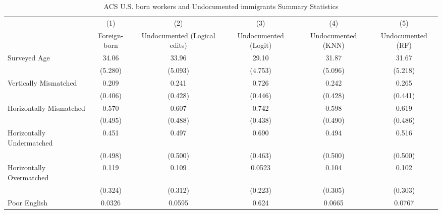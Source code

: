 \begin{table}[htbp]\centering
\def\sym#1{\ifmmode^{#1}\else\(^{#1}\)\fi}
\caption{ACS U.S. born workers and Undocumented immigrants Summary Statistics \label{tab:sum}}
\begin{tabular}{l*{5}{c}}
\hline\hline
                    &\multicolumn{1}{c}{(1)}         &\multicolumn{1}{c}{(2)}         &\multicolumn{1}{c}{(3)}         &\multicolumn{1}{c}{(4)}         &\multicolumn{1}{c}{(5)}         \\
                    &Foreign-born         &Undocumented (Logical edits)         &Undocumented (Logit)         &Undocumented (KNN)         &Undocumented (RF)         \\
\hline
Surveyed Age        &       34.06         &       33.96         &       29.10         &       31.87         &       31.67         \\
                    &     (5.280)         &     (5.093)         &     (4.753)         &     (5.096)         &     (5.218)         \\
[1em]
Vertically Mismatched&       0.209         &       0.241         &       0.726         &       0.242         &       0.265         \\
                    &     (0.406)         &     (0.428)         &     (0.446)         &     (0.428)         &     (0.441)         \\
[1em]
Horizontally Mismatched&       0.570         &       0.607         &       0.742         &       0.598         &       0.619         \\
                    &     (0.495)         &     (0.488)         &     (0.438)         &     (0.490)         &     (0.486)         \\
[1em]
Horizontally Undermatched&       0.451         &       0.497         &       0.690         &       0.494         &       0.516         \\
                    &     (0.498)         &     (0.500)         &     (0.463)         &     (0.500)         &     (0.500)         \\
[1em]
Horizontally Overmatched&       0.119         &       0.109         &      0.0523         &       0.104         &       0.102         \\
                    &     (0.324)         &     (0.312)         &     (0.223)         &     (0.305)         &     (0.303)         \\
[1em]
Poor English        &      0.0326         &      0.0595         &       0.624         &      0.0665         &      0.0767         \\

\end{tabular}
\end{table}
